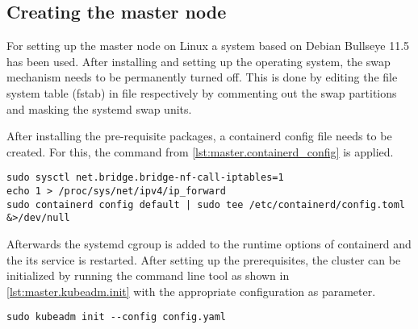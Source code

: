 \subsection{Creating the master node}
For setting up the master node on Linux a system based on Debian Bullseye 11.5 has been used. After installing and setting up the operating system, the swap mechanism needs to be permanently turned off. This is done by editing the file system table (fstab) in file  respectively by commenting out the swap partitions and masking the systemd swap units.



%


After installing the pre-requisite packages, a containerd config file needs to be created. For this, the command from \autoref{lst:master.containerd_config} is applied.
\begin{lstlisting}[label=lst:master.containerd_config, caption={Bash command for setting up containerd config}]
sudo sysctl net.bridge.bridge-nf-call-iptables=1
echo 1 > /proc/sys/net/ipv4/ip_forward
sudo containerd config default | sudo tee /etc/containerd/config.toml &>/dev/null
\end{lstlisting}
Afterwards the systemd \ac{cgroup} is added to the runtime options of containerd and the its service is restarted.
After setting up the prerequisites, the cluster can be initialized by running the command line tool as shown in \autoref{lst:master.kubeadm.init} with the appropriate configuration as parameter.
\begin{lstlisting}[label=lst:master.kubeadm.init, caption={Bash command for setting up the cluster}]
sudo kubeadm init --config config.yaml
\end{lstlisting}

